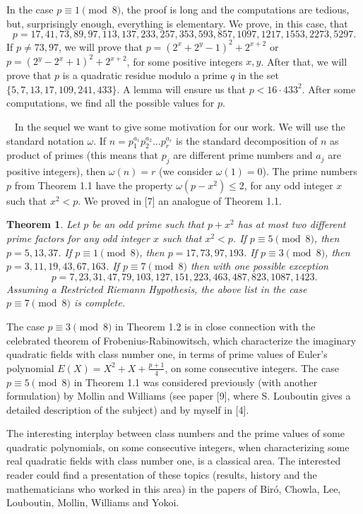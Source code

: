 \documentclass[12pt]{article}
\newtheorem{theorem}[definition]{Theorem}
{\theorembodyfont{\rmfamily}\newtheorem{example}[definition]{Example}}
{\theorembodyfont{\rmfamily}\newtheorem{examples}[definition]{Examples}}
{\theorembodyfont{\rmfamily}\newtheorem{observation}[definition]{Observation}}
\begin{document}
{In the case $p\equiv 1 \pmod 8$, the proof is long and the computations are tedious, but, surprisingly enough, everything is elementary. We prove, in this case, that  $$p=17,41,73,89,97,113,137,233,257,353,593,857,1097,1217,1553,2273,5297.$$ If $p\neq 73,97$, we will prove that $p=(2^x+2^y-1)^2+2^{x+2}$ or $p=(2^y-2^x+1)^2+2^{x+2}$, for some positive integers $x,y$. After that, we will prove that $p$ is a quadratic residue modulo a prime $q$ in the set $\{5,7,13,17,109,241,433\}$. A lemma will ensure us that $p<16\cdot 433^2$. After some computations, we find all the possible values for $p$.

$\;\;\;$In the sequel we want to give some motivation for our work. We will use the standard notation $\omega$. If $n=p_1^{a_1}p_2^{a_2}...p_r^{a_r}$ is the standard decomposition of $n$ as product of primes (this means that $p_j$ are different prime numbers and $a_j$ are positive integers), then $\omega (n)=r$ (we consider $\omega (1)=0$). The prime numbers $p$ from Theorem 1.1 have the property $\omega (p-x^2)\leq 2$, for any odd integer $x$ such that $x^2< p$. We proved in [7] an analogue of Theorem 1.1.

\begin{theorem}
Let $p$ be an odd prime such that $p+x^2$ has at most two different prime factors for any odd integer $x$ such that $x^2<p$. If $p\equiv 5 \pmod 8$, then $p=5,13,37$. If $p\equiv 1 \pmod 8$, then $p=17,73,97,193$. If $p\equiv 3 \pmod 8$, then $p=3,11,19,43,67,163$.  If $p\equiv 7 \pmod 8$ then with one possible exception $$p=7,23,31,47,79,103,127,151,223,463,487,823,1087,1423.$$ Assuming a Restricted Riemann Hypothesis, the above list in the case $p\equiv 7 \pmod 8$ is complete.
\end{theorem}

The case $p\equiv 3 \pmod 8$ in Theorem 1.2 is in close connection with the celebrated theorem of Frobenius-Rabinowitsch, which characterize the imaginary quadratic fields with class number one, in terms of prime values of Euler's polynomial $E(X)=X^2+X+\frac{p+1}{4}$, on some consecutive integers. The case $p\equiv 5 \pmod 8$ in Theorem 1.1 was considered previously (with another formulation) by Mollin and Williams (see paper [9], where S. Louboutin gives a detailed description of the subject) and by myself in [4].

The interesting interplay between class numbers and the prime values of some quadratic polynomials, on some consecutive integers, when characterizing some real quadratic fields with class number one, is a classical area. The interested reader could find a presentation of these topics (results, history and the mathematicians who worked in this area) in the papers of Bir\'{o}, Chowla, Lee, Louboutin, Mollin, Williams and Yokoi.

}
\end{document}

